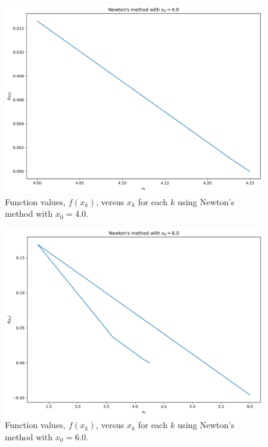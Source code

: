 \documentclass[11pt]{article}
\begin{document}
\begin{figure}[H]
	\centering
	\includegraphics[width=\linewidth]{../figures/Newtons_f_4.0}
	\caption{Function values, $f(x_k)$, versus $x_k$ for each $k$ using Newton's method with $x_0 = 4.0$.}
	\label{fig:newton_f_4.0}
\end{figure}

\begin{figure}[H]
	\centering
	\includegraphics[width=\linewidth]{../figures/Newtons_f_6.0}
	\caption{Function values, $f(x_k)$, versus $x_k$ for each $k$ using Newton's method with $x_0 = 6.0$.}
	\label{fig:newton_f_6.0}
\end{figure}

\end{document}
